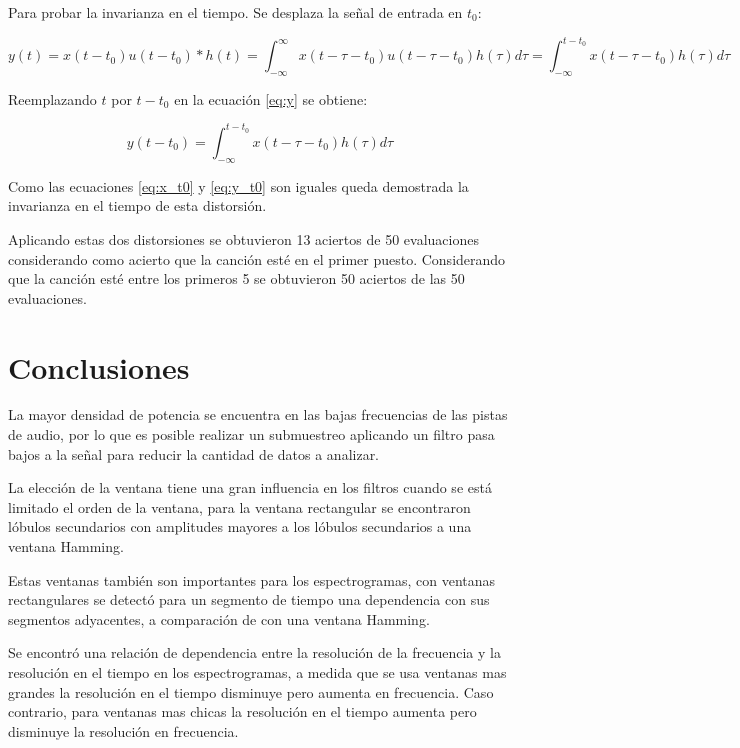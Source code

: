 \documentclass[10pt,spanish,a4paper,openany,notitlepage]{article}
\begin{document}
Para probar la invarianza en el tiempo. Se desplaza la señal de entrada en $t_0$:

\begin{equation}
\label{eq:x_t0}
y(t) = x(t-t_0) u(t-t_0) * h(t) = \int_{-\infty}^\infty x(t-\tau-t_0) u(t-\tau-t_0) h(\tau) d\tau = \int_{-\infty}^{t-t_0} x(t-\tau-t_0) h(\tau) d\tau
\end{equation}

Reemplazando $t$ por $t-t_0$ en la ecuación \ref{eq:y} se obtiene:

\begin{equation}
\label{eq:y_t0}
y(t-t_0)=\int_{-\infty}^{t-t_0} x(t-\tau-t_0) h(\tau) d\tau
\end{equation}

Como las ecuaciones \ref{eq:x_t0} y \ref{eq:y_t0} son iguales queda
demostrada la invarianza en el tiempo de esta distorsión.

Aplicando estas dos distorsiones se obtuvieron 13 aciertos de 50 evaluaciones
considerando como acierto que la canción esté en el primer puesto.
Considerando que la canción esté entre los primeros 5 se obtuvieron
50 aciertos de las 50 evaluaciones.

\section{Conclusiones}

La mayor densidad de potencia se encuentra en las bajas frecuencias de
las pistas de audio, por lo que es posible realizar un submuestreo aplicando
un filtro pasa bajos a la señal para reducir la cantidad de datos a analizar.

La elección de la ventana tiene una gran influencia en los filtros cuando
se está limitado el orden de la ventana, para la ventana rectangular
se encontraron lóbulos secundarios con amplitudes mayores a los lóbulos
secundarios a una ventana Hamming.

Estas ventanas también son importantes para los espectrogramas, con
ventanas rectangulares se detectó para un segmento de tiempo una dependencia con
sus segmentos adyacentes, a comparación de con una ventana Hamming.

Se encontró una relación de dependencia entre la resolución de la frecuencia
y la resolución en el tiempo en los espectrogramas, a medida que se usa ventanas
mas grandes la resolución en el tiempo disminuye pero aumenta en frecuencia.
Caso contrario, para ventanas mas chicas la resolución en el tiempo aumenta
pero disminuye la resolución en frecuencia.
\end{document}
